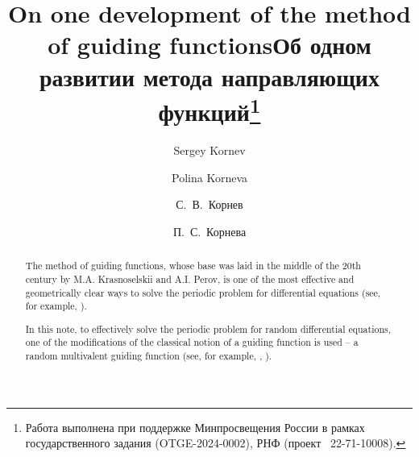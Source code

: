 \begin{englishtitle} %
\title{On one development of the method of guiding functions}
\author{Sergey Kornev \and Polina Korneva  
 }

\maketitle

\begin{abstract}
The method of guiding functions, whose base was laid in the middle of the 20th century by M.A. Krasnoselskii and A.I. Perov, is one of the most effective and geometrically clear ways to solve the periodic problem for differential equations (see, for example, \cite{k_kr}).

In this note, to effectively solve the periodic problem for random differential equations, one of the modifications of the classical notion of a guiding function is used -- a random multivalent guiding function (see, for example, \cite{k_k_o_z_2}, \cite{o_k_k}).

\end{abstract}
\end{englishtitle}

\iffalse
\documentclass[12pt]{llncs}


\usepackage{iftex}

\ifPDFTeX
\usepackage[T2A]{fontenc}
\usepackage[utf8]{inputenc} %
\usepackage[english,russian]{babel}
\fi

\usepackage{todonotes}

\usepackage[russian]{nla}


\fi

%

\title{Об одном развитии метода направляющих функций\thanks{Работа выполнена при поддержке Минпросвещения России в рамках государственного задания (OTGE-2024-0002), РНФ (проект \textnumero~22-71-10008).}}
\author{С.~В.~Корнев  \and П.~С.~Корнева 
 } %

